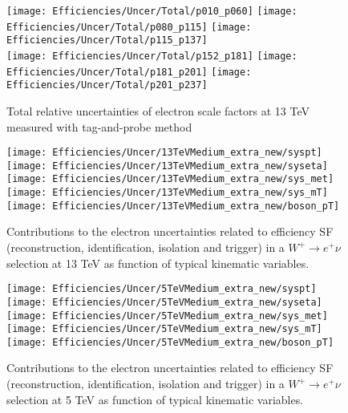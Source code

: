     \begin{figure}[htbp]
    	\centering
    	\texttt{[image: Efficiencies/Uncer/Total/p010\_p060]}
    	\texttt{[image: Efficiencies/Uncer/Total/p080\_p115]}
    	\texttt{[image: Efficiencies/Uncer/Total/p115\_p137]} \\
    	\texttt{[image: Efficiencies/Uncer/Total/p152\_p181]}
    	\texttt{[image: Efficiencies/Uncer/Total/p181\_p201]}
    	\texttt{[image: Efficiencies/Uncer/Total/p201\_p237]} \\
    	\caption{Total relative uncertainties of electron scale factors at 13 TeV measured with tag-and-probe method}
    	\label{fig:all_uncertainty_tp}
    \end{figure}
    
    \begin{figure}[htbp]
    	\begin{center}
    		\texttt{[image: Efficiencies/Uncer/13TeVMedium\_extra\_new/syspt]}
    		\texttt{[image: Efficiencies/Uncer/13TeVMedium\_extra\_new/syseta]}
    		\texttt{[image: Efficiencies/Uncer/13TeVMedium\_extra\_new/sys\_met]}
    		\texttt{[image: Efficiencies/Uncer/13TeVMedium\_extra\_new/sys\_mT]}
    		\texttt{[image: Efficiencies/Uncer/13TeVMedium\_extra\_new/boson\_pT]}
    		\caption{Contributions to the electron uncertainties related to
    			efficiency SF (reconstruction, identification, isolation and
    			trigger) in a $W^{+}\rightarrow e^{+}\nu$ selection at 13 TeV as
    			function of typical kinematic variables.}
    		\label{fig:total_sys_13_medium}
    	\end{center}
    \end{figure}
    
    
    \begin{figure}[htbp]
    	\begin{center}
    		\texttt{[image: Efficiencies/Uncer/5TeVMedium\_extra\_new/syspt]}
    		\texttt{[image: Efficiencies/Uncer/5TeVMedium\_extra\_new/syseta]}
    		\texttt{[image: Efficiencies/Uncer/5TeVMedium\_extra\_new/sys\_met]}
    		\texttt{[image: Efficiencies/Uncer/5TeVMedium\_extra\_new/sys\_mT]}
    		\texttt{[image: Efficiencies/Uncer/5TeVMedium\_extra\_new/boson\_pT]}
    		\caption{Contributions to the electron uncertainties related to
    			efficiency SF (reconstruction, identification, isolation and
    			trigger) in a $W^{+}\rightarrow e^{+}\nu$ selection at 5 TeV as
    			function of typical kinematic variables.}
    		\label{fig:total_sys_5_medium}
    	\end{center}
    \end{figure}
    \clearpage
    
